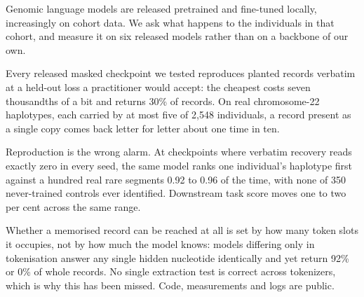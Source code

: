 Genomic language models are released pretrained and fine-tuned locally, increasingly on cohort data.
We ask what happens to the individuals in that cohort, and measure it on six released models rather
than on a backbone of our own.

Every released masked checkpoint we tested reproduces planted records verbatim at a held-out loss a
practitioner would accept: the cheapest costs seven thousandths of a bit and returns 30\% of records.
On real chromosome-22 haplotypes, each carried by at most five of 2{,}548 individuals, a record
present as a single copy comes back letter for letter about one time in ten.

Reproduction is the wrong alarm. At checkpoints where verbatim recovery reads exactly zero in every
seed, the same model ranks one individual's haplotype first against a hundred real rare segments
0.92 to 0.96 of the time, with none of 350 never-trained controls ever identified. Downstream task
score moves one to two per cent across the same range.

Whether a memorised record can be reached at all is set by how many token slots it occupies, not by
how much the model knows: models differing only in tokenisation answer any single hidden nucleotide
identically and yet return 92\% or 0\% of whole records. No single extraction test is correct across
tokenizers, which is why this has been missed. Code, measurements and logs are public.

